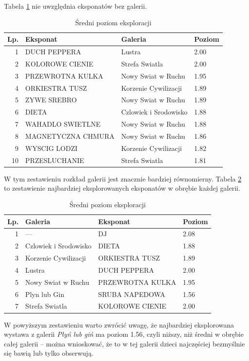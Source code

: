 \documentclass[conference]{IEEEtran}
\begin{document}
Tabela \ref{top_zach_b} nie uwzględnia eksponatów bez galerii.
\begin{table}[H]
\caption{Średni poziom eksploracji}
\label{top_zach_b}
\centering
\begin{tabular}{|r|l|l|l|}
\hline
\textbf{Lp.} & \textbf{Eksponat} & \textbf{Galeria} & \textbf{Poziom} \\
\hline
1  &       DUCH PEPPERA &                Lustra & 2.00 \\
2  &    KOLOROWE CIENIE &        Strefa Swiatla & 2.00 \\
3  &   PRZEWROTNA KULKA &    Nowy Swiat w Ruchu & 1.95 \\
4  &     ORKIESTRA TUSZ &  Korzenie Cywilizacji & 1.89 \\
5  &        ZYWE SREBRO &    Nowy Swiat w Ruchu & 1.89 \\
6  &              DIETA & Czlowiek i Srodowisko & 1.88 \\
7  &   WAHADLO SWIETLNE &    Nowy Swiat w Ruchu & 1.88 \\
8  & MAGNETYCZNA CHMURA &    Nowy Swiat w Ruchu & 1.86 \\
9  &       WYSCIG LODZI &  Korzenie Cywilizacji & 1.82 \\
10 &      PRZESLUCHANIE &        Strefa Swiatla & 1.81 \\
\hline
\end{tabular}
\end{table}
W tym zestawieniu rozkład galerii jest znacznie bardziej równomierny.
Tabela \ref{top_zach_g} to zestawienie najbardziej eksplorowanych eksponatów w obrębie każdej galerii.

\begin{table}[H]
\caption{Średni poziom eksploracji}
\label{top_zach_g}
\centering
\begin{tabular}{|r|l|l|l|}
\hline
\textbf{Lp.} & \textbf{Galeria} & \textbf{Eksponat} & \textbf{Poziom} \\
\hline
1 &                ---    &            DJ    &  2.08	\\
2 & Czlowiek i Srodowisko &            DIETA &     1.88	\\
3 &  Korzenie Cywilizacji &   ORKIESTRA TUSZ &     1.89	\\
4 &                Lustra &     DUCH PEPPERA &                    2.00	\\
5 &    Nowy Swiat w Ruchu & PRZEWROTNA KULKA &     1.95	\\
6 &          Plyn lub Gin &   SRUBA NAPEDOWA &     1.56	\\
7 &        Strefa Swiatla &  KOLOROWE CIENIE &                    2.00	\\
\hline
\end{tabular}
\end{table}
W powyższym zestawieniu warto zwrócić uwagę, że najbardziej eksplorowana wystawa z galerii \textit{Płyń lub giń} ma poziom 1.56, czyli niższy, niż średni w obrębie całej galerii -- można wnioskować, że to w tej galerii dzieci najczęściej bezmyślnie się bawią lub tylko obserwują. 
\end{document}
